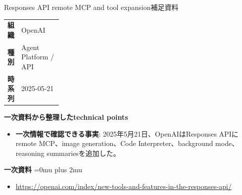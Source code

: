 \begin{technicalnote}{Responses API remote MCP and tool expansion}{補足資料}
\begingroup
\begin{tabularx}{\linewidth}{@{}>{\bfseries}p{0.22\linewidth}X@{}}
組織 & OpenAI \\
種別 & Agent Platform / API \\
時系列 & 2025-05-21 \\
\end{tabularx}
\smallskip
\begin{minipage}{\linewidth}
{\bfseries 一次資料から整理したtechnical points}
\begin{itemize}[leftmargin=1.5em,itemsep=0.35em]
\item \textbf{一次情報で確認できる事実}: 2025年5月21日、OpenAIはResponses APIにremote MCP、image generation、Code Interpreter、background mode、reasoning summariesを追加した。
\end{itemize}
\begin{samepage}
{\bfseries 一次資料}
\begingroup\sloppy
\Urlmuskip=0mu plus 2mu\relax
\begin{itemize}[leftmargin=1.5em,itemsep=0.25em]
\item {\scriptsize\url{https://openai.com/index/new-tools-and-features-in-the-responses-api/}}
\end{itemize}
\endgroup
\end{samepage}
\end{minipage}
\endgroup
\end{technicalnote}
\medskip

